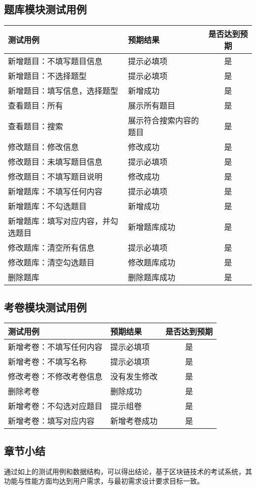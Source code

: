 \subsection{题库模块测试用例}
\begin{table}[ht!]
\begin{tabularx}{\linewidth}{@{}Xlc@{}}
\toprule
测试用例           & 预期结果      & 是否达到预期 \\ \midrule
新增题目：不填写题目信息 & 提示必填项 & 是 \\
新增题目：不选择题型 & 提示必填项 & 是  \\
新增题目：填写信息，选择题型 & 新增成功 & 是 \\
查看题目：所有 & 展示所有题目 & 是 \\
查看题目：搜索 & 展示符合搜索内容的题目 & 是 \\
修改题目：修改信息 & 修改成功 & 是 \\
修改题目：未填写题目信息 & 提示必填项 & 是 \\
修改题目：不填写题目说明 & 修改成功 & 是  \\
新增题库：不填写任何内容   & 提示必填项 & 是      \\
新增题库：不勾选题目 & 新增成功 & 是      \\
新增题库：填写对应内容，并勾选题目    & 新增题库成功    & 是   \\ 
修改题库：清空所有信息  & 提示必填项      & 是      \\
修改题库：清空勾选题目  & 修改题库成功    & 是      \\
删除题库 & 删除题库成功 & 是  \\ \bottomrule
\end{tabularx}
\end{table}

\subsection{考卷模块测试用例}
\begin{table}[ht!]
\begin{tabularx}{\linewidth}{@{}Xlc@{}}
\toprule
测试用例           & 预期结果      & 是否达到预期 \\ \midrule
新增考卷：不填写任何内容   & 提示必填项 & 是      \\
新增考卷：不填写名称 & 提示必填项 & 是      \\
修改考卷：不修改考卷信息  & 没有发生修改      & 是      \\
删除考卷  & 删除成功    & 是      \\
新增考卷：不勾选对应题目 & 提示组卷 & 是  \\
新增考卷：填写对应内容    & 新增考卷成功    & 是   \\ \bottomrule
\end{tabularx}
\end{table}


\subsection{章节小结}
通过如上的测试用例和数据结构，可以得出结论，基于区块链技术的考试系统，其功能与性能方面均达到用户需求，与最初需求设计要求目标一致。